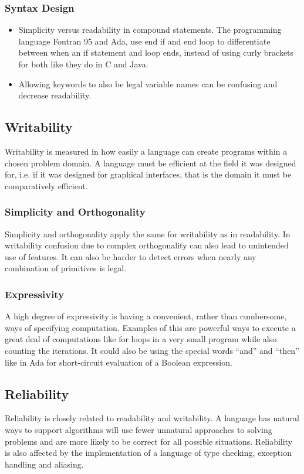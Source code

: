\subsubsection*{Syntax Design}
\begin{itemize}
 \item Simplicity versus readability in compound statements. The programming language Fontran 95 and Ada, use end if and end loop to differentiate between when an if statement and loop ends, instead of using curly brackets for both like they do in C and Java.
\item Allowing keywords to also be legal variable names can be confusing and decrease readability.
\end{itemize}

\subsection*{Writability}
Writability is measured in how easily a language can create programs within a chosen problem domain.
A language must be efficient at the field it was designed for, i.e. if it was designed for graphical interfaces, that is the domain it must be comparatively efficient.
\subsubsection*{Simplicity and Orthogonality}
Simplicity and orthogonality apply the same for writability as in readability. In writability confusion due to complex orthogonality can also lead to unintended use of features. It can also be harder to detect errors when nearly any combination of primitives is legal.
\subsubsection*{Expressivity}
A high degree of expressivity is having a convenient, rather than cumbersome, ways of specifying computation. Examples of this are powerful ways to execute a great deal of computations like for loops in a very small program while also counting the iterations. It could also be using the special words “and” and “then” like in Ada for short-circuit evaluation of a Boolean expression.

\subsection*{Reliability}
Reliability is closely related to readability and writability. A language has natural ways to support algorithms will use fewer unnatural approaches to solving problems and are more likely to be correct for all possible situations.
Reliability is also affected by the implementation of a language of type checking, exception handling and aliasing.
